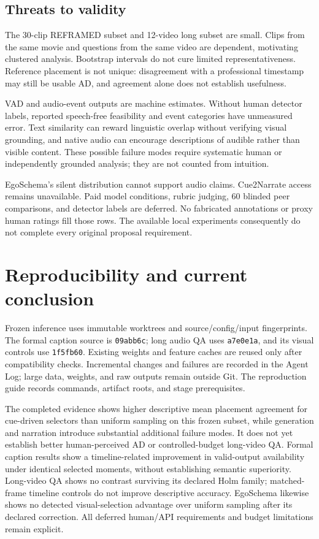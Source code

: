 \documentclass[10pt,twocolumn]{article}
\begin{document}
\subsection{Threats to validity}
The 30-clip REFRAMED subset and 12-video long subset are small. Clips from the same movie and questions from the same video are dependent, motivating clustered analysis. Bootstrap intervals do not cure limited representativeness. Reference placement is not unique: disagreement with a professional timestamp may still be usable AD, and agreement alone does not establish usefulness.

VAD and audio-event outputs are machine estimates. Without human detector labels, reported speech-free feasibility and event categories have unmeasured error. Text similarity can reward linguistic overlap without verifying visual grounding, and native audio can encourage descriptions of audible rather than visible content. These possible failure modes require systematic human or independently grounded analysis; they are not counted from intuition.

EgoSchema's silent distribution cannot support audio claims. Cue2Narrate access remains unavailable. Paid model conditions, rubric judging, 60 blinded peer comparisons, and detector labels are deferred. No fabricated annotations or proxy human ratings fill those rows. The available local experiments consequently do not complete every original proposal requirement.

\section{Reproducibility and current conclusion}
Frozen inference uses immutable worktrees and source/config/input fingerprints. The formal caption source is \texttt{09abb6c}; long audio QA uses \texttt{a7e0e1a}, and its visual controls use \texttt{1f5fb60}. Existing weights and feature caches are reused only after compatibility checks. Incremental changes and failures are recorded in the Agent Log; large data, weights, and raw outputs remain outside Git. The reproduction guide records commands, artifact roots, and stage prerequisites.

The completed evidence shows higher descriptive mean placement agreement for cue-driven selectors than uniform sampling on this frozen subset, while generation and narration introduce substantial additional failure modes. It does not yet establish better human-perceived AD or controlled-budget long-video QA. Formal caption results show a timeline-related improvement in valid-output availability under identical selected moments, without establishing semantic superiority. Long-video QA shows no contrast surviving its declared Holm family; matched-frame timeline controls do not improve descriptive accuracy. EgoSchema likewise shows no detected visual-selection advantage over uniform sampling after its declared correction. All deferred human/API requirements and budget limitations remain explicit.
\end{document}
